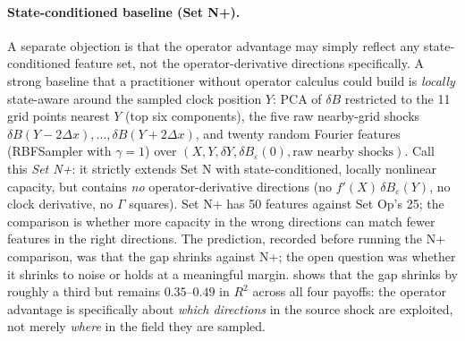 \documentclass[11pt,reqno]{amsart}
\theoremstyle{plain}
\theoremstyle{definition}
\theoremstyle{remark}
\newcommand{\Bvar}{B}
\newcommand{\Yclock}{Y}
\begin{document}
\paragraph{State-conditioned baseline (Set N+).}
A separate objection is that the operator advantage may simply
reflect any state-conditioned feature set, not the
operator-derivative directions specifically. A strong baseline
that a practitioner without operator calculus could build is
\emph{locally} state-aware around the sampled clock position
$\Yclock$: PCA of $\delta\Bvar$ restricted to the 11 grid points
nearest $\Yclock$ (top six components), the five raw
nearby-grid shocks
$\delta\Bvar(\Yclock-2\Delta x),\ldots,\delta\Bvar(\Yclock+2\Delta x)$,
and twenty random Fourier features (RBFSampler with $\gamma=1$)
over $(X,\Yclock,\delta\Yclock,\delta\Bvar_{\varepsilon}(0),
\text{raw nearby shocks})$. Call this \emph{Set N+}: it
strictly extends Set N with state-conditioned, locally nonlinear
capacity, but contains \emph{no} operator-derivative directions
(no $f'(X)\,\delta\Bvar_{\varepsilon}(\Yclock)$, no clock
derivative, no $\Gamma$ squares). Set N+ has 50 features
against Set Op's 25; the comparison is whether more capacity in
the wrong directions can match fewer features in the right
directions. The prediction, recorded before running the N+
comparison, was that the gap shrinks against N+; the open
question was whether it shrinks to noise or holds at a
meaningful margin.  shows that the gap shrinks
by roughly a third but remains $0.35$--$0.49$ in $R^{2}$ across
all four payoffs: the operator advantage is specifically about
\emph{which directions} in the source shock are exploited, not
merely \emph{where} in the field they are sampled.
\end{document}
